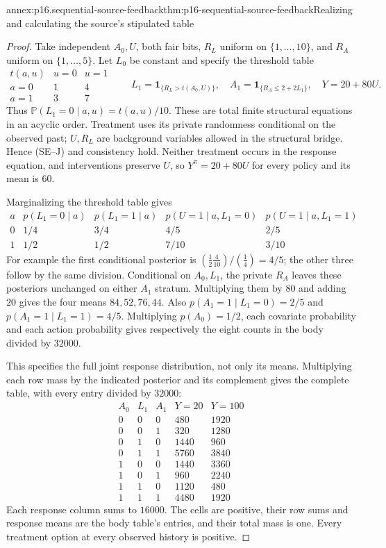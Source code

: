 \begin{annexitem}{annex:p16.sequential-source-feedback}{thm:p16-sequential-source-feedback}{Realizing and calculating the source's stipulated table}
\begin{proof}
Take independent \(A_0,U\), both fair bits, \(R_L\) uniform on
\(\{1,\ldots,10\}\), and \(R_A\) uniform on \(\{1,\ldots,5\}\).
Let \(L_0\) be constant and specify the threshold table
\[
\begin{array}{c|cc}
 t(a,u)&u=0&u=1\\\hline
 a=0&1&4\\a=1&3&7
\end{array}
\qquad
 L_1=\mathbf1_{\{R_L>t(A_0,U)\}},\quad
 A_1=\mathbf1_{\{R_A\leq2+2L_1\}},\quad Y=20+80U.
\]
Thus \(\mathbb P(L_1=0\mid a,u)=t(a,u)/10\). These are total
finite structural equations in an acyclic order. Treatment uses its
private randomness conditional on the observed past; \(U,R_L\) are
background variables allowed in the structural bridge. Hence (SE--J)
and consistency hold. Neither treatment occurs in the response equation,
and interventions preserve \(U\), so \(Y^\pi=20+80U\) for every policy
and its mean is \(60\).

Marginalizing the threshold table gives
\[
\begin{array}{c|cc|cc}
 a& p(L_1=0\mid a)&p(L_1=1\mid a)&
       p(U=1\mid a,L_1=0)&p(U=1\mid a,L_1=1)\\\hline
 0&1/4&3/4&4/5&2/5\\
 1&1/2&1/2&7/10&3/10
\end{array}
\]
For example the first conditional posterior is
\((\frac12\frac4{10})/(\frac14)=4/5\); the other three follow by the
same division. Conditional on \(A_0,L_1\), the private \(R_A\) leaves
these posteriors unchanged on either \(A_1\) stratum. Multiplying them
by \(80\) and adding \(20\) gives the four means \(84,52,76,44\).
Also \(p(A_1=1\mid L_1=0)=2/5\) and
\(p(A_1=1\mid L_1=1)=4/5\). Multiplying \(p(A_0)=1/2\), each
covariate probability and each action probability gives respectively
the eight counts in the body divided by \(32000\).

This specifies the full joint response distribution, not only its means.
Multiplying each row mass by the indicated posterior and its complement
gives the complete table, with every entry divided by \(32000\):
\[
\begin{array}{ccc|rr}
 A_0&L_1&A_1&Y=20&Y=100\\\hline
 0&0&0&480&1920\\0&0&1&320&1280\\
 0&1&0&1440&960\\0&1&1&5760&3840\\
 1&0&0&1440&3360\\1&0&1&960&2240\\
 1&1&0&1120&480\\1&1&1&4480&1920
\end{array}
\]
Each response column sums to \(16000\). The cells are positive,
their row sums and response means are the body table's entries, and
their total mass is one. Every treatment option at every observed
history is positive.


\end{proof}
\end{annexitem}

